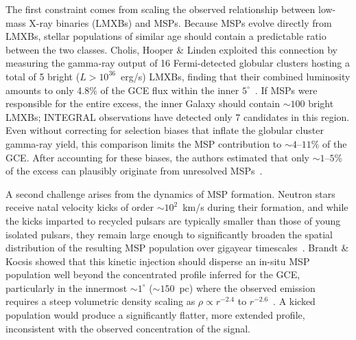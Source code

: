 The first constraint comes from scaling the observed relationship between low-mass X-ray binaries (LMXBs) and MSPs.
Because MSPs evolve directly from LMXBs, stellar populations of similar age should contain a predictable ratio between the two classes.
Cholis, Hooper \& Linden exploited this connection by measuring the gamma-ray output of 16 Fermi-detected globular clusters hosting a total of 5 bright ($L > 10^{36}$~erg/s) LMXBs, finding that their combined luminosity amounts to only 4.8\% of the GCE flux within the inner $5^\circ$~\cite{Cholis:2014lta}.
If MSPs were responsible for the entire excess, the inner Galaxy should contain $\sim 100$ bright LMXBs; INTEGRAL observations have detected only 7 candidates in this region.
Even without correcting for selection biases that inflate the globular cluster gamma-ray yield, this comparison limits the MSP contribution to $\sim 4$--$11$\% of the GCE.
After accounting for these biases, the authors estimated that only $\sim 1$--$5$\% of the excess can plausibly originate from unresolved MSPs~\cite{Cholis:2014lta}.

A second challenge arises from the dynamics of MSP formation.
Neutron stars receive natal velocity kicks of order $\sim 10^2$~km/s during their formation, and while the kicks imparted to recycled pulsars are typically smaller than those of young isolated pulsars, they remain large enough to significantly broaden the spatial distribution of the resulting MSP population over gigayear timescales~\cite{Brandt:2015ula}.
Brandt \& Kocsis showed that this kinetic injection should disperse an in-situ MSP population well beyond the concentrated profile inferred for the GCE, particularly in the innermost $\sim 1^\circ$ ($\sim 150$~pc) where the observed emission requires a steep volumetric density scaling as $\rho \propto r^{-2.4}$ to $r^{-2.6}$~\cite{Brandt:2015ula}.
A kicked population would produce a significantly flatter, more extended profile, inconsistent with the observed concentration of the signal.

